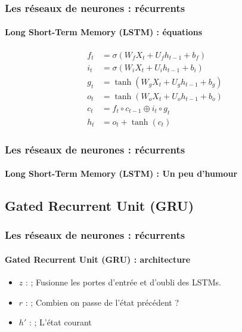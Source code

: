 \documentclass[xcolor=table]{beamer}
\begin{document}
\begin{frame}
	\frametitle{Les réseaux de neurones : récurrents}
	\framesubtitle{Long Short-Term Memory (LSTM) : équations}
	
	\begin{align*}
	f_t &= \sigma(W_f X_t + U_f h_{t-1} + b_f) \\
	i_t &= \sigma(W_i X_t + U_i h_{t-1} + b_i) \\
	g_t &= \tanh(W_g X_t + U_g h_{t-1} + b_g) \\
	o_t &= \tanh(W_o X_t + U_o h_{t-1} + b_o) \\
	c_t &= f_t \circ c_{t-1} \oplus i_t \circ g_t \\
	h_t &= o_t + \tanh(c_t)
	\end{align*}
	
\end{frame}

\begin{frame}
\frametitle{Les réseaux de neurones : récurrents}
\framesubtitle{Long Short-Term Memory (LSTM) : Un peu d'humour}

\begin{center}
\end{center}

\end{frame}

\subsection{Gated Recurrent Unit (GRU)}

\begin{frame}
\frametitle{Les réseaux de neurones : récurrents}
\framesubtitle{Gated Recurrent Unit (GRU) : architecture}
	
	\begin{minipage}{0.50\textwidth} 
		\begin{itemize}
			\item $z$ :  ; 
			Fusionne les portes d'entrée et d'oubli des LSTMs.
			\item $r$ :  ; 
			Combien on passe de l'état précédent ?
			\item $h'$ :  ;
			L'état courant	
		\end{itemize}
	\end{minipage}
	\begin{minipage}{0.49\textwidth}
	\end{minipage}
	

\end{frame}
\end{document}
